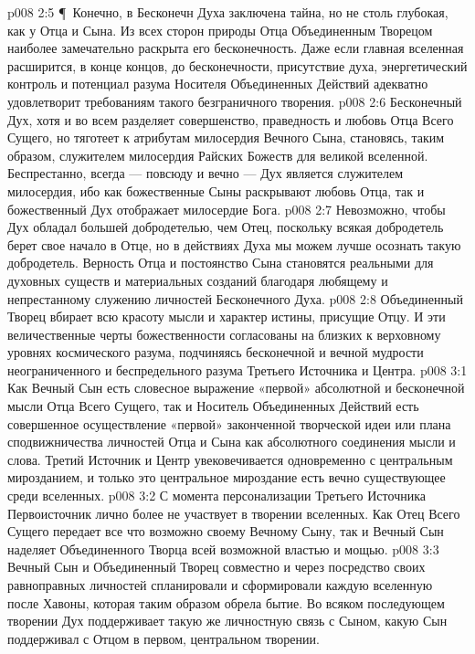 \vs p008 2:5 \P\ Конечно, в Бесконечн Духа заключена тайна, но не столь глубокая, как у Отца и Сына. Из всех сторон природы Отца Объединенным Творецом наиболее замечательно раскрыта его бесконечность. Даже если главная вселенная расширится, в конце концов, до бесконечности, присутствие духа, энергетический контроль и потенциал разума Носителя Объединенных Действий адекватно удовлетворит требованиям такого безграничного творения.
\vs p008 2:6 Бесконечный Дух, хотя и во всем разделяет совершенство, праведность и любовь Отца Всего Сущего, но тяготеет к атрибутам милосердия Вечного Сына, становясь, таким образом, служителем милосердия Райских Божеств для великой вселенной. Беспрестанно, всегда --- повсюду и вечно --- Дух является служителем милосердия, ибо как божественные Сыны раскрывают любовь Отца, так и божественный Дух отображает милосердие Бога.
\vs p008 2:7 Невозможно, чтобы Дух обладал большей добродетелью, чем Отец, поскольку всякая добродетель берет свое начало в Отце, но в действиях Духа мы можем лучше осознать такую добродетель. Верность Отца и постоянство Сына становятся реальными для духовных существ и материальных созданий благодаря любящему и непрестанному служению личностей Бесконечного Духа.
\vs p008 2:8 Объединенный Творец вбирает всю красоту мысли и характер истины, присущие Отцу. И эти величественные черты божественности согласованы на близких к верховному уровнях космического разума, подчиняясь бесконечной и вечной мудрости неограниченного и беспредельного разума Третьего Источника и Центра.
\vs p008 3:1 Как Вечный Сын есть словесное выражение «первой» абсолютной и бесконечной мысли Отца Всего Сущего, так и Носитель Объединенных Действий есть совершенное осуществление «первой» законченной творческой идеи или плана сподвижничества личностей Отца и Сына как абсолютного соединения мысли и слова. Третий Источник и Центр увековечивается одновременно с центральным мирозданием, и только это центральное мироздание есть вечно существующее среди вселенных.
\vs p008 3:2 С момента персонализации Третьего Источника Первоисточник лично более не участвует в творении вселенных. Как Отец Всего Сущего передает все что возможно своему Вечному Сыну, так и Вечный Сын наделяет Объединенного Творца всей возможной властью и мощью.
\vs p008 3:3 Вечный Сын и Объединенный Творец совместно и через посредство своих равноправных личностей спланировали и сформировали каждую вселенную после Хавоны, которая таким образом обрела бытие. Во всяком последующем творении Дух поддерживает такую же личностную связь с Сыном, какую Сын поддерживал с Отцом в первом, центральном творении.
